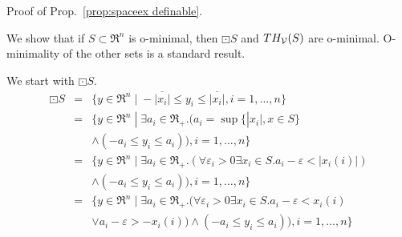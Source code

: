 Proof of Prop.~\ref{prop:spaceex definable}.
\begin{prf}
	\newcommand{\EPS}{\mathcal{E}}
	We show that if $S \subset \Re^n$ is o-minimal, then $\boxdot S$ and $TH_{\mathcal{V}}(S)$ are o-minimal. 
	O-minimality of the other sets is a standard result.
	
	We start with $\boxdot S$.
	\begin{eqnarray*}
		\boxdot S &=& \{y \in \Re^n \;|\; -\overline{|x_i|}\leq y_i \leq \overline{|x_i|},i=1,\ldots,n\}
		\\
		&=& \{y \in \Re^n \;|\; \exists a_i \in \Re_+. (a_i = \sup \{|x_i|,x\in S\} 
		\\
		&& \land (-a_i\leq y_i \leq a_i)),i=1,\ldots,n\}
		\\
		&=&  \{y \in \Re^n \;|\; \exists a_i \in \Re_+. (\forall \varepsilon_i>0 \exists x_i \in S . a_i-\varepsilon < |x_i(i)|)
		\\
		&& \land (-a_i\leq y_i \leq a_i)),i=1,\ldots,n\}
		\\
		&=&  \{y \in \Re^n \;|\; \exists a_i \in \Re_+. (\forall \varepsilon_i>0 \exists x_i \in S . a_i-\varepsilon < x_i(i)
		\\
		&& \lor a_i - \varepsilon > -x_i(i)) \land (-a_i\leq y_i \leq a_i)),i=1,\ldots,n\}
\end{eqnarray*}


\end{prf}
